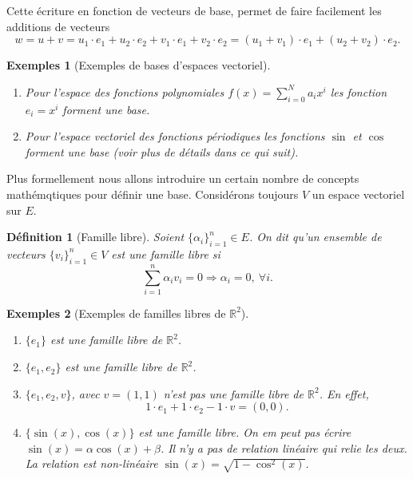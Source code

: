 \documentclass[a4paper,12pt]{book}
\newcommand{\real}{\mathbb{R}}
\newtheorem{definition}{Définition}
\newtheorem*{exemples}{Exemples}
\begin{document}
Cette écriture en fonction de vecteurs de base, permet de faire facilement les additions de vecteurs
\begin{equation}
 w=u+v=u_1\cdot e_1+u_2\cdot e_2+v_1\cdot e_1+v_2\cdot e_2=(u_1+v_1)\cdot e_1+(u_2+v_2)\cdot e_2.
\end{equation}

\begin{exemples}[Exemples de bases d'espaces vectoriel]\hfill\break
 \begin{enumerate}
  \item Pour l'espace des fonctions polynomiales $f(x)=\sum_{i=0}^Na_ix^i$ les 
  fonction $e_i=x^i$ forment une base.
  \item Pour l'espace vectoriel des fonctions périodiques les fonctions $\sin$ et $\cos$ forment une base
  (voir plus de détails dans ce qui suit).
 \end{enumerate}

\end{exemples}

Plus formellement nous allons introduire un certain nombre de concepts mathémqtiques pour
définir une base. Considérons toujours $V$ un espace vectoriel sur $E$.

\begin{definition}[Famille libre]
 Soient $\{\alpha_i\}_{i=1}^n\in E$. On dit qu'un ensemble de vecteurs $\{v_i\}_{i=1}^n\in V$ est une famille libre si 
 \begin{equation}
  \sum_{i=1}^n \alpha_iv_i=0 \Rightarrow \alpha_i=0,\ \forall i.
 \end{equation}
\end{definition}
\begin{exemples}[Exemples de familles libres de $\real^2$]\hfill\break
\begin{enumerate}
 \item $\{e_1\}$ est une famille libre de $\real^2$.
 \item $\{e_1,e_2\}$ est une famille libre de $\real^2$.
 \item $\{e_1,e_2,v\}$, avec $v=(1,1)$ n'est pas une famille libre de $\real^2$. En effet,
 \begin{equation}
  1\cdot e_1+1\cdot e_2-1\cdot v=(0,0).
 \end{equation}
 \item $\{\sin(x),\cos(x)\}$ est une famille libre. On em peut pas écrire $\sin(x)=\alpha\cos(x)+\beta$. Il n'y a pas de relation
 linéaire qui relie les deux. La relation est non-linéaire $\sin(x)=\sqrt{1-\cos^2(x)}$.
\end{enumerate}
\end{exemples}
\end{document}
